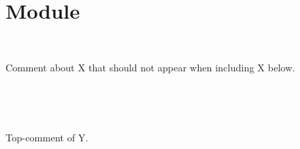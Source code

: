 \section{Module }\label{Include2}%
\label{Include2--module-X}\label{Include2-X}\begin{ocamlindent}\label{Include2-X--type-t}\\
\end{ocamlindent}%
\begin{ocamlindent}Comment about X that should not appear when including X below.\end{ocamlindent}%
\medbreak
{}      \hyperref[Include2-X]{} \label{Include2--type-t}\\
\label{Include2--module-Y}\label{Include2-Y}\begin{ocamlindent}\label{Include2-Y--type-t}\\
\end{ocamlindent}%
\begin{ocamlindent}Top-comment of Y.\end{ocamlindent}%
\medbreak
\label{Include2--module-Y_include_synopsis}\label{Include2-Y_include_synopsis}\begin{ocamlindent}      \hyperref[Include2-Y]{} \label{Include2-Y_include_synopsis--type-t}\\
\end{ocamlindent}%
